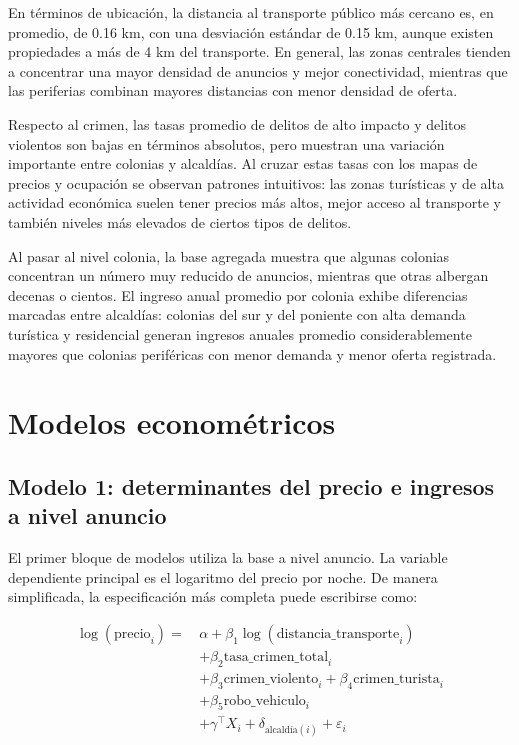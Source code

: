 \documentclass[12pt]{article}
\begin{document}
En términos de ubicación, la distancia al transporte público más cercano es, en promedio, de 0.16 km, con una desviación estándar de 0.15 km, aunque existen propiedades a más de 4 km del transporte. En general, las zonas centrales tienden a concentrar una mayor densidad de anuncios y mejor conectividad, mientras que las periferias combinan mayores distancias con menor densidad de oferta.

Respecto al crimen, las tasas promedio de delitos de alto impacto y delitos violentos son bajas en términos absolutos, pero muestran una variación importante entre colonias y alcaldías. Al cruzar estas tasas con los mapas de precios y ocupación se observan patrones intuitivos: las zonas turísticas y de alta actividad económica suelen tener precios más altos, mejor acceso al transporte y también niveles más elevados de ciertos tipos de delitos.

Al pasar al nivel colonia, la base agregada muestra que algunas colonias concentran un número muy reducido de anuncios, mientras que otras albergan decenas o cientos. El ingreso anual promedio por colonia exhibe diferencias marcadas entre alcaldías: colonias del sur y del poniente con alta demanda turística y residencial generan ingresos anuales promedio considerablemente mayores que colonias periféricas con menor demanda y menor oferta registrada.

\section{Modelos econométricos}

\subsection{Modelo 1: determinantes del precio e ingresos a nivel anuncio}

El primer bloque de modelos utiliza la base a nivel anuncio. La variable dependiente principal es el logaritmo del precio por noche. De manera simplificada, la especificación más completa puede escribirse como:

\begin{align}
\log(\text{precio}_i)
=\, & \alpha 
+ \beta_1 \log(\text{distancia\_transporte}_i) \\
& + \beta_2 \text{tasa\_crimen\_total}_i \\
& + \beta_3 \text{crimen\_violento}_i 
+ \beta_4 \text{crimen\_turista}_i \\
& + \beta_5 \text{robo\_vehiculo}_i \\
& + \gamma^\top X_i
+ \delta_{\text{alcaldía}(i)}
+ \varepsilon_i
\end{align}
\end{document}
